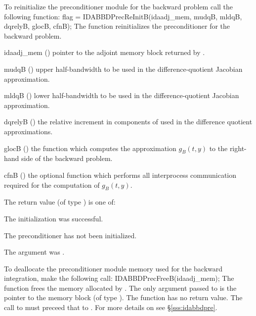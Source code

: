 {}
To reinitialize the {\idabbdpre} preconditioner module for the backward problem
call the following function:
{
  flag = IDABBDPrecReInitB(idaadj\_mem, mudqB, mldqB, dqrelyB, glocB, cfnB);
}
{
  The function  reinitializes the {\idabbdpre} preconditioner
  for the backward problem.
}
{
  \begin{args}
  \item[idaadj\_mem] ()
    pointer to the adjoint memory block returned by .
  \item[mudqB] ()
    upper half-bandwidth to be used in the difference-quotient Jacobian approximation.
  \item[mldqB] ()
    lower half-bandwidth to be used in the difference-quotient Jacobian approximation.
  \item[dqrelyB] ()
    the relative increment in components of  used in the difference quotient
    approximations.
  \item[glocB] ()
    the {\C} function which computes the approximation $g_B(t,y)$  to the right-hand
    side of the backward problem. 
  \item[cfnB] ()
    the optional {\C} function which performs all interprocess communication required for
    the computation of $g_B(t,y)$.
  \end{args}
}
{
  The return value  (of type ) is one of:
  \begin{args}
  \item[\Id{IDABBDPRE\_SUCCESS}] 
    The {\idabbdpre} initialization was successful.
  \item[\Id{IDABBDPRE\_PDATA\_NULL}]
    The {\idabbdpre} preconditioner has not been initialized.
  \item[\Id{IDABBDPRE\_ADJMEM\_NULL}]
    The  argument was .
  \end{args}
}
{}
To deallocate the {\idabbdpre} preconditioner module memory used for the
backward integration, make the following call:
{
  IDABBDPrecFreeB(idaadj\_mem);
}
{
  The function  frees the memory allocated by
  .
}
{
  The only argument passed to  is the pointer to the {\idaa} 
  memory block (of type ).
}
{
  The function  has no return value.
}
{
  The call to  must preceed that to .
}
For more details on {\idabbdpre} see \S\ref{sss:idabbdpre}.

